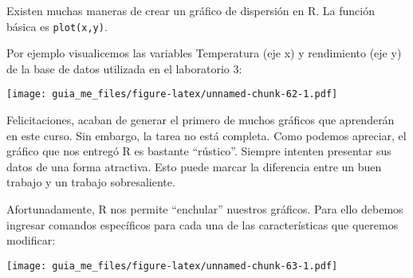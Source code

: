 \documentclass[]{book}
\newenvironment{Shaded}{\begin{snugshade}}{\end{snugshade}}
\newcommand{\DataTypeTok}[1]{\textcolor[rgb]{0.13,0.29,0.53}{#1}}
\newcommand{\DecValTok}[1]{\textcolor[rgb]{0.00,0.00,0.81}{#1}}
\newcommand{\FloatTok}[1]{\textcolor[rgb]{0.00,0.00,0.81}{#1}}
\newcommand{\KeywordTok}[1]{\textcolor[rgb]{0.13,0.29,0.53}{\textbf{#1}}}
\newcommand{\NormalTok}[1]{#1}
\newcommand{\OperatorTok}[1]{\textcolor[rgb]{0.81,0.36,0.00}{\textbf{#1}}}
\newcommand{\StringTok}[1]{\textcolor[rgb]{0.31,0.60,0.02}{#1}}
\begin{document}
Existen muchas maneras de crear un gráfico de dispersión en R. La función básica es \texttt{plot(x,y)}.

Por ejemplo visualicemos las variables Temperatura (eje x) y rendimiento (eje y) de la base de datos utilizada en el laboratorio 3:

\begin{Shaded}
\end{Shaded}

\texttt{[image: guia\_me\_files/figure-latex/unnamed-chunk-62-1.pdf]}

Felicitaciones, acaban de generar el primero de muchos gráficos que aprenderán en este curso. Sin embargo,
la tarea no está completa. Como podemos apreciar, el gráfico que nos entregó R es bastante ``rústico''.
Siempre intenten presentar sus datos de una forma atractiva. Esto puede marcar la diferencia entre un buen
trabajo y un trabajo sobresaliente.

Afortunadamente, R nos permite ``enchular'' nuestros gráficos. Para ello debemos ingresar comandos
específicos para cada una de las características que queremos modificar:

\begin{Shaded}
\end{Shaded}

\texttt{[image: guia\_me\_files/figure-latex/unnamed-chunk-63-1.pdf]}
\end{document}
